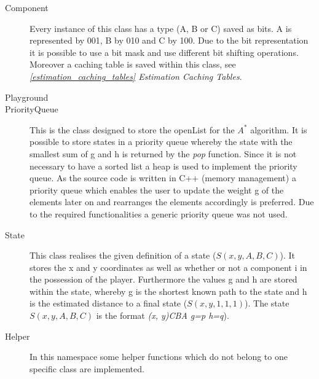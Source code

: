 \documentclass{article}
\begin{document}
\begin{description}
    \item[Component] Every instance of this class has a type (A, B or C) saved as bits. A is represented by 001, B by 010 and C by 100. Due to the bit representation it is possible to use a bit mask and use different bit shifting operations. Moreover a caching table is saved within this class, see \textit{\ref{estimation_caching_tables} Estimation Caching Tables}.
    \item[Playground]
    \item[PriorityQueue] This is the class designed to store the openList for the $A^*$ algorithm. It is possible to store states in a priority queue whereby the state with the smallest sum of g and h is returned by the \textit{pop} function. Since it is not necessary to have a sorted list a heap is used to implement the priority queue. As the source code is written in C++ (memory management) a priority queue which enables the user to update the weight g of the elements later on and rearranges the elements accordingly is preferred. Due to the required functionalities a generic priority queue was not used.
    \item[State] This class realises the given definition of a state ($S(x,y,A,B,C)$). It stores the x and y coordinates as well as whether or not a component i in the possession of the player. Furthermore the values g and h are stored within the state, whereby g is the shortest known path to the state and h is the estimated distance to a final state ($S(x,y,1,1,1)$). The state $S(x,y,A,B,C)$ is the format \textit{(x, y)CBA g=p h=q}).
    \item[Helper] In this namespace some helper functions which do not belong to one specific class are implemented.
\end{description}
\begin{comment}
\subsection{Klassen}
Artifact

playground
erzeugt durch einlesen der files, basic object
calculate path --> hauptfunction
getEstimate, unser H
bitmaske artifact
artifact, bitmaske 
\end{comment}
\end{document}
